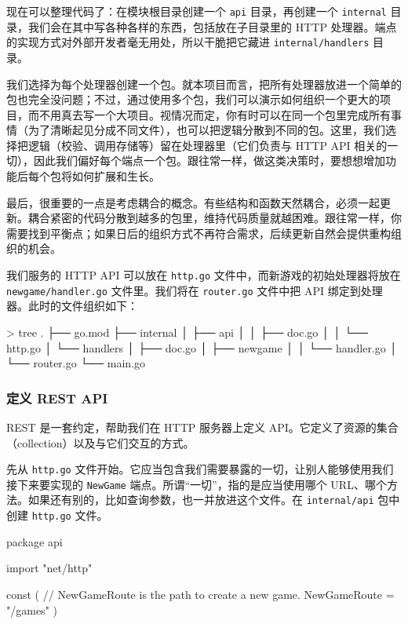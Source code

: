 现在可以整理代码了：在模块根目录创建一个 \texttt{api} 目录，再创建一个 \texttt{internal} 目录，我们会在其中写各种各样的东西，包括放在子目录里的 HTTP 处理器。端点的实现方式对外部开发者毫无用处，所以干脆把它藏进 \texttt{internal/handlers} 目录。

我们选择为每个处理器创建一个包。就本项目而言，把所有处理器放进一个简单的包也完全没问题；不过，通过使用多个包，我们可以演示如何组织一个更大的项目，而不用真去写一个大项目。视情况而定，你有时可以在同一个包里完成所有事情（为了清晰起见分成不同文件），也可以把逻辑分散到不同的包。这里，我们选择把逻辑（校验、调用存储等）留在处理器里（它们负责与 HTTP API 相关的一切），因此我们偏好每个端点一个包。跟往常一样，做这类决策时，要想想增加功能后每个包将如何扩展和生长。

最后，很重要的一点是考虑耦合的概念。有些结构和函数天然耦合，必须一起更新。耦合紧密的代码分散到越多的包里，维持代码质量就越困难。跟往常一样，你需要找到平衡点；如果日后的组织方式不再符合需求，后续更新自然会提供重构组织的机会。

我们服务的 HTTP API 可以放在 \texttt{http.go} 文件中，而新游戏的初始处理器将放在 \texttt{newgame/handler.go} 文件里。我们将在 \texttt{router.go} 文件中把 API 绑定到处理器。此时的文件组织如下：

\begin{shellcode}[]
> tree
.
├── go.mod
├── internal
│   ├── api
│   │   ├── doc.go
│   │   └── http.go
│   └── handlers
│       ├── doc.go
│       ├── newgame
│       │   └── handler.go
│       └── router.go
└── main.go
\end{shellcode}

\subsubsection*{定义 REST API}

REST 是一套约定，帮助我们在 HTTP 服务器上定义 API。它定义了资源的集合（collection）以及与它们交互的方式。

先从 \texttt{http.go} 文件开始。它应当包含我们需要暴露的一切，让别人能够使用我们接下来要实现的 \texttt{NewGame} 端点。所谓``一切''，指的是应当使用哪个 URL、哪个方法。如果还有别的，比如查询参数，也一并放进这个文件。在 \texttt{internal/api} 包中创建 \texttt{http.go} 文件。

\begin{gocode}[title={代码清单 8.2 \texttt{api/http.go}：定义 \texttt{NewGame} 端点所需之物}]
package api

import "net/http"

const (
    // NewGameRoute is the path to create a new game.
    NewGameRoute  = "/games"
)
\end{gocode}

